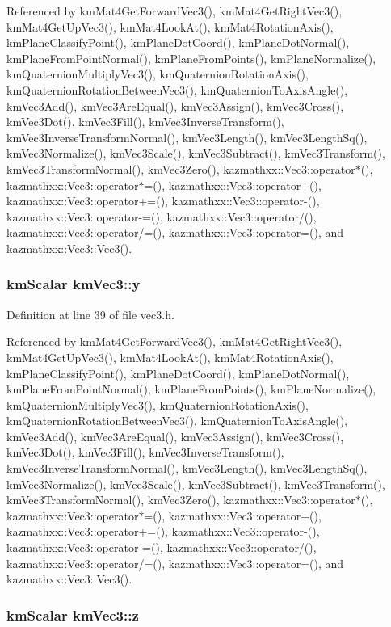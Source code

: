 Referenced by kmMat4GetForwardVec3(), kmMat4GetRightVec3(), kmMat4GetUpVec3(), kmMat4LookAt(), kmMat4RotationAxis(), kmPlaneClassifyPoint(), kmPlaneDotCoord(), kmPlaneDotNormal(), kmPlaneFromPointNormal(), kmPlaneFromPoints(), kmPlaneNormalize(), kmQuaternionMultiplyVec3(), kmQuaternionRotationAxis(), kmQuaternionRotationBetweenVec3(), kmQuaternionToAxisAngle(), kmVec3Add(), kmVec3AreEqual(), kmVec3Assign(), kmVec3Cross(), kmVec3Dot(), kmVec3Fill(), kmVec3InverseTransform(), kmVec3InverseTransformNormal(), kmVec3Length(), kmVec3LengthSq(), kmVec3Normalize(), kmVec3Scale(), kmVec3Subtract(), kmVec3Transform(), kmVec3TransformNormal(), kmVec3Zero(), kazmathxx::Vec3::operator$\ast$(), kazmathxx::Vec3::operator$\ast$=(), kazmathxx::Vec3::operator+(), kazmathxx::Vec3::operator+=(), kazmathxx::Vec3::operator-(), kazmathxx::Vec3::operator-=(), kazmathxx::Vec3::operator/(), kazmathxx::Vec3::operator/=(), kazmathxx::Vec3::operator=(), and kazmathxx::Vec3::Vec3().\hypertarget{structkm_vec3_45906c9d76262c5a9dd1c3774ee937eb}{
\subsubsection[y]{\setlength{\rightskip}{0pt plus 5cm}kmScalar {\bf kmVec3::y}}}
\label{structkm_vec3_45906c9d76262c5a9dd1c3774ee937eb}




Definition at line 39 of file vec3.h.

Referenced by kmMat4GetForwardVec3(), kmMat4GetRightVec3(), kmMat4GetUpVec3(), kmMat4LookAt(), kmMat4RotationAxis(), kmPlaneClassifyPoint(), kmPlaneDotCoord(), kmPlaneDotNormal(), kmPlaneFromPointNormal(), kmPlaneFromPoints(), kmPlaneNormalize(), kmQuaternionMultiplyVec3(), kmQuaternionRotationAxis(), kmQuaternionRotationBetweenVec3(), kmQuaternionToAxisAngle(), kmVec3Add(), kmVec3AreEqual(), kmVec3Assign(), kmVec3Cross(), kmVec3Dot(), kmVec3Fill(), kmVec3InverseTransform(), kmVec3InverseTransformNormal(), kmVec3Length(), kmVec3LengthSq(), kmVec3Normalize(), kmVec3Scale(), kmVec3Subtract(), kmVec3Transform(), kmVec3TransformNormal(), kmVec3Zero(), kazmathxx::Vec3::operator$\ast$(), kazmathxx::Vec3::operator$\ast$=(), kazmathxx::Vec3::operator+(), kazmathxx::Vec3::operator+=(), kazmathxx::Vec3::operator-(), kazmathxx::Vec3::operator-=(), kazmathxx::Vec3::operator/(), kazmathxx::Vec3::operator/=(), kazmathxx::Vec3::operator=(), and kazmathxx::Vec3::Vec3().\hypertarget{structkm_vec3_539514eaeee81aaeee3bb90f7a1581af}{
\subsubsection[z]{\setlength{\rightskip}{0pt plus 5cm}kmScalar {\bf kmVec3::z}}}
\label{structkm_vec3_539514eaeee81aaeee3bb90f7a1581af}




